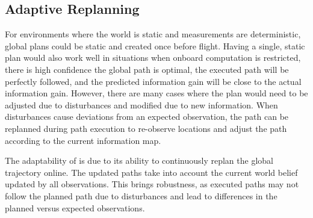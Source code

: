 




\subsection{Adaptive Replanning}\label{sec:replanning}

For environments where the world is static and measurements are deterministic, global plans could be static and created once before flight. Having a single, static plan would also work well in situations when onboard computation is restricted, there is high confidence the global path is optimal, the executed path will be perfectly followed, and the predicted information gain will be close to the actual information gain. However, there are many cases where the plan would need to be adjusted due to disturbances and modified due to new information. When disturbances cause deviations from an expected observation, the path can be replanned during path execution to re-observe locations and adjust the path according to the current information map. 

The adaptability of \PlannerNameSpaced is due to its ability to continuously replan the global trajectory online. The updated paths take into account the current world belief updated by all observations. This brings robustness, as executed paths may not follow the planned path due to disturbances and lead to differences in the planned versus expected observations. 

